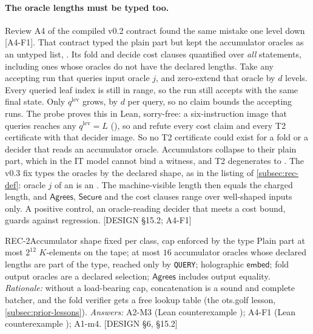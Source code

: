 \paragraph{The oracle lengths must be typed too.} Review A4 of the compiled v0.2 contract found the
same mistake one level down [A4-F1]. That contract typed the plain part but kept the accumulator
oracles as an untyped list, . Its fold and decide
cost clauses quantified over \emph{all} statements, including ones whose oracles do not have the
declared lengths. Take any accepting run that queries input oracle $j$, and zero-extend that oracle by
$d$ levels. Every queried leaf index is still in range, so the run still accepts with the same final
state. Only $q^{\mathrm{lev}}$ grows, by $d$ per query, so no claim bounds the accepting runs. The
probe proves this in Lean, sorry-free: a six-instruction image  that queries reaches
any $q^{\mathrm{lev}}=L$ (), so  and
 refute every cost claim and  every T2 certificate
with that decider image.
So no T2 certificate could exist for a fold or a decider that reads an accumulator oracle. Accumulators
collapse to their plain part, which in the IT model cannot bind a witness, and T2 degenerates to
. The v0.3 fix types the oracles by the declared shape, as in the listing of
\cref{subsec:rec-def}: oracle $j$ of an  is an . The
machine-visible length then equals the charged length,
and $\mathsf{Agrees}$, $\mathsf{Secure}$ and the cost clauses range over well-shaped inputs only. A
positive control, an oracle-reading decider that meets a cost bound, guards against regression.
[DESIGN §15.2; A4-F1]

\begin{decision}{REC-2}{Accumulator shape fixed per class, cap enforced by the type}
Plain part at most $2^{12}$ $K$-elements on the tape; at most $16$ accumulator oracles whose declared
lengths are part of the type, reached only by \texttt{QUERY}; holographic $\mathsf{embed}$; fold output oracles are a
declared selection; $\mathsf{Agrees}$ includes output equality. \emph{Rationale:} without a
load-bearing cap, concatenation is a sound and complete batcher, and the fold verifier gets a free
lookup table (the ots.golf lesson, \cref{subsec:prior-lessons}). \emph{Answers:} A2-M3 (Lean
counterexample ); A4-F1 (Lean counterexample );
A1-m4. [DESIGN §6, §15.2]
\end{decision}

